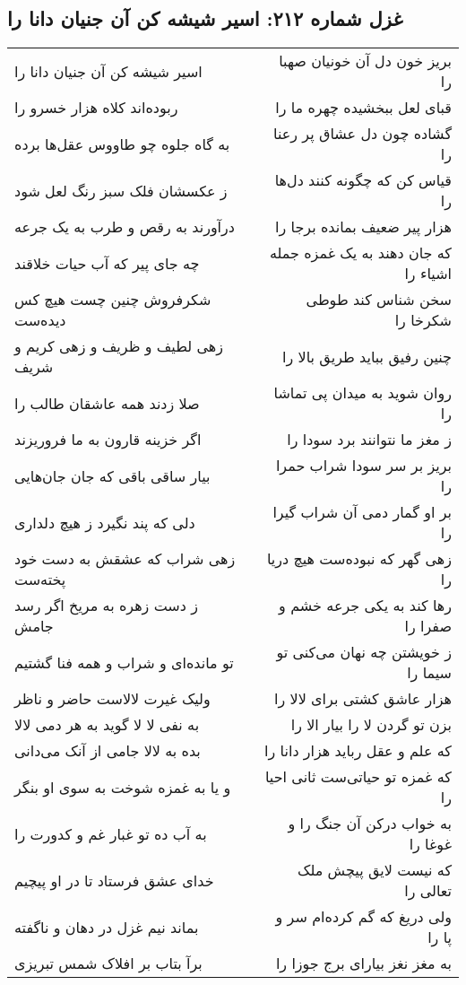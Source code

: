 \begin{center}
\section*{غزل شماره ۲۱۲: اسیر شیشه کن آن جنیان دانا را}
\label{sec:0212}
\begin{longtable}{l p{0.5cm} r}
اسیر شیشه کن آن جنیان دانا را
&&
بریز خون دل آن خونیان صهبا را
\\
ربوده‌اند کلاه هزار خسرو را
&&
قبای لعل ببخشیده چهره ما را
\\
به گاه جلوه چو طاووس عقل‌ها برده
&&
گشاده چون دل عشاق پر رعنا را
\\
ز عکسشان فلک سبز رنگ لعل شود
&&
قیاس کن که چگونه کنند دل‌ها را
\\
درآورند به رقص و طرب به یک جرعه
&&
هزار پیر ضعیف بمانده برجا را
\\
چه جای پیر که آب حیات خلاقند
&&
که جان دهند به یک غمزه جمله اشیاء را
\\
شکرفروش چنین چست هیچ کس دیده‌ست
&&
سخن شناس کند طوطی شکرخا را
\\
زهی لطیف و ظریف و زهی کریم و شریف
&&
چنین رفیق بباید طریق بالا را
\\
صلا زدند همه عاشقان طالب را
&&
روان شوید به میدان پی تماشا را
\\
اگر خزینه قارون به ما فروریزند
&&
ز مغز ما نتوانند برد سودا را
\\
بیار ساقی باقی که جان جان‌هایی
&&
بریز بر سر سودا شراب حمرا را
\\
دلی که پند نگیرد ز هیچ دلداری
&&
بر او گمار دمی آن شراب گیرا را
\\
زهی شراب که عشقش به دست خود پخته‌ست
&&
زهی گهر که نبوده‌ست هیچ دریا را
\\
ز دست زهره به مریخ اگر رسد جامش
&&
رها کند به یکی جرعه خشم و صفرا را
\\
تو مانده‌ای و شراب و همه فنا گشتیم
&&
ز خویشتن چه نهان می‌کنی تو سیما را
\\
ولیک غیرت لالاست حاضر و ناظر
&&
هزار عاشق کشتی برای لالا را
\\
به نفی لا لا گوید به هر دمی لالا
&&
بزن تو گردن لا را بیار الا را
\\
بده به لالا جامی از آنک می‌دانی
&&
که علم و عقل رباید هزار دانا را
\\
و یا به غمزه شوخت به سوی او بنگر
&&
که غمزه تو حیاتی‌ست ثانی احیا را
\\
به آب ده تو غبار غم و کدورت را
&&
به خواب درکن آن جنگ را و غوغا را
\\
خدای عشق فرستاد تا در او پیچیم
&&
که نیست لایق پیچش ملک تعالی را
\\
بماند نیم غزل در دهان و ناگفته
&&
ولی دریغ که گم کرده‌ام سر و پا را
\\
برآ بتاب بر افلاک شمس تبریزی
&&
به مغز نغز بیارای برج جوزا را
\\
\end{longtable}
\end{center}

